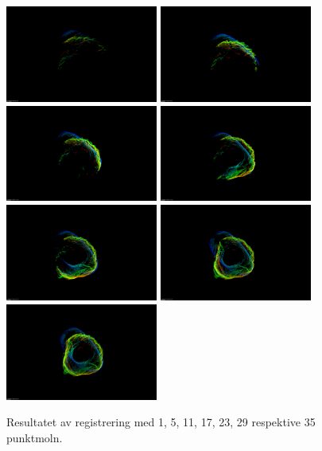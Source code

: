 \begin{figure}[H]
	\centering
	\includegraphics[width=50mm]{figures/Result_0.png}
	\includegraphics[width=50mm]{figures/Result_5.png}
	\includegraphics[width=50mm]{figures/Result_11.png}
	\includegraphics[width=50mm]{figures/Result_17.png}
	\includegraphics[width=50mm]{figures/Result_23.png}
	\includegraphics[width=50mm]{figures/Result_29.png}
	\includegraphics[width=50mm]{figures/Result_35.png}
	\caption{Resultatet av registrering med 1, 5, 11, 17, 23, 29 respektive 35 punktmoln.}
	\label{fig:registrering_resultat}
\end{figure}

